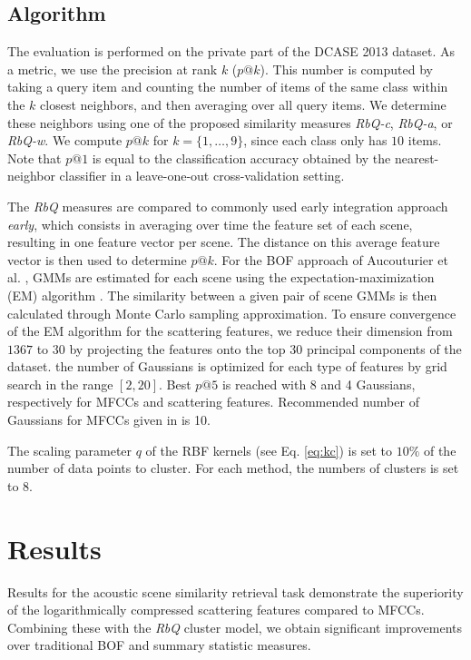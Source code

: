 \documentclass[smallextended]{svjour3}
\begin{document}
\subsection{Algorithm}

The evaluation is performed on the private part of the DCASE 2013 dataset. As a metric, we use the precision at rank $k$ ($p@k$). This number is computed by taking a query item and counting the number of items of the same class within the $k$ closest neighbors, and then averaging over all query items. We determine these neighbors using one of the proposed similarity measures \emph{RbQ-c}, \emph{RbQ-a}, or \emph{RbQ-w}. We compute $p@k$ for $k=\lbrace 1,\ldots,9\rbrace$, since each class only has $10$ items. Note that $p@1$ is equal to the classification accuracy obtained by the nearest-neighbor classifier in a leave-one-out cross-validation setting.

The \emph{RbQ} measures are compared to commonly used early integration approach \emph{early}, which consists in averaging over time the feature set of each scene, resulting in one feature vector per scene. The distance on this average feature vector is then used to determine $p@k$. For the BOF approach of Aucouturier et al. \cite{aucouturier2007bag}, GMMs are estimated for each scene using the expectation-maximization (EM) algorithm \cite{dempster-laird, moon1996expectation}. The similarity between a given pair of scene GMMs is then calculated through Monte Carlo sampling approximation. To ensure convergence of the EM algorithm for the scattering features, we reduce their dimension from $1367$ to $30$ by projecting the features onto the top $30$ principal components of the dataset. the number of Gaussians is optimized for each type of features by grid search in the range $[2, 20]$. Best $p@5$ is reached with 8 and 4  Gaussians, respectively for MFCCs and scattering features. Recommended number of Gaussians for MFCCs given in \cite{aucouturier2007bag} is 10.

The scaling parameter $q$ of the RBF kernels (see Eq. \ref{eq:kc}) is set to $10\%$ of the number of data points to cluster. For each method, the numbers of clusters is set to $8$.

\section{Results \label{sec:results}}

Results for the acoustic scene similarity retrieval task demonstrate the superiority of the logarithmically compressed scattering features compared to MFCCs.
Combining these with the \emph{RbQ} cluster model, we obtain significant improvements over traditional BOF and summary statistic measures.
\end{document}
